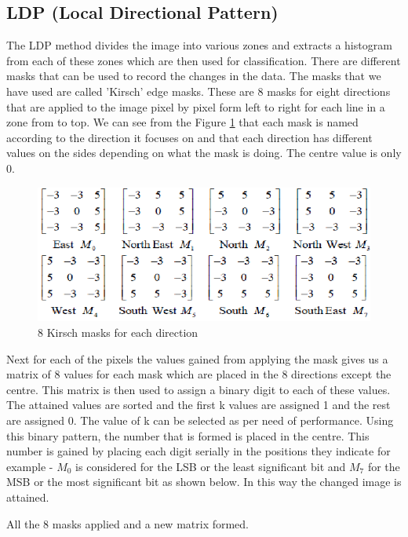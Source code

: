 \documentclass[conference]{IEEEtran}
\begin{document}
\subsection{LDP (Local Directional Pattern)}
The LDP method divides the image into various zones and extracts a histogram from each of these zones which are then used for classification.
There are different masks that can be used to record the changes in the data. The masks that we have used are called 'Kirsch' edge masks. These are 8 masks for eight directions that are applied to the image pixel by pixel form left to right for each line in a zone from to top. We can see from the Figure \ref{fig:kirschmask} that each mask is named according to the direction it focuses on and that each direction has different values on the sides depending on what the mask is doing. The centre value is only 0.
\begin{figure}
	\includegraphics[width=\linewidth]{kirschmask.png}
	\caption{8 Kirsch masks for each direction}
	\label{fig:kirschmask}
\end{figure}
Next for each of the pixels the values gained from applying the mask gives us a matrix of 8 values for each mask which are placed in the 8 directions except the centre. This matrix is then used to assign a binary digit to each of these values. The attained values are sorted and the first k values are assigned 1 and the rest are assigned 0. The value of k can be selected as per need of performance. Using this binary pattern, the number that is formed is placed in the centre. This number is gained by placing each digit serially in the positions they indicate for example - $M_0$ is considered for the LSB or the least significant bit and $M_7$ for the MSB or the most significant bit as shown below. In this way the changed image is attained.
\begin{center}
	All the 8 masks applied and a new matrix formed.\\
\end{center}
\end{document}
